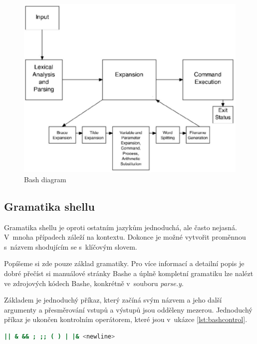 \documentclass[thesis=M,czech]{FITthesis}[2012/06/26]
\begin{document}
\begin{figure}[htb]\centering
	\includegraphics[width=\textwidth]{./images/bash-article-diagram}
	\caption{Bash diagram}
	\label{fig:bash_diag}
\end{figure}




%
%
%
\subsection{Gramatika shellu}

Gramatika shellu je oproti ostatním jazykům jednoduchá, ale často nejasná. V~mnoha případech záleží na kontextu. Dokonce je možné vytvořit proměnnou s~názvem shodujícím se s~klíčovým slovem.

Popíšeme si zde pouze základ gramatiky. Pro více informací a detailní popis je dobré přečíst si manuálové stránky Bashe a úplně kompletní gramatiku lze nalézt ve zdrojových kódech Bashe, konkrétně v~souboru \textit{parse.y}.

Základem je jednoduchý příkaz, který začíná svým názvem a jeho další argumenty a přesměrování vstupů a výstupů jsou odděleny mezerou. Jednoduchý příkaz je ukončen kontrolním operátorem, které jsou v~ukázce \ref{lst:bashcontrol}.

\begin{minipage}{\linewidth}
\begin{lstlisting}[language=bash, caption={Kontrolní operátory v~Bashi}, label={lst:bashcontrol}]
|| & && ; ;; ( ) | |& <newline>
\end{lstlisting}
\end{minipage}
\end{document}

